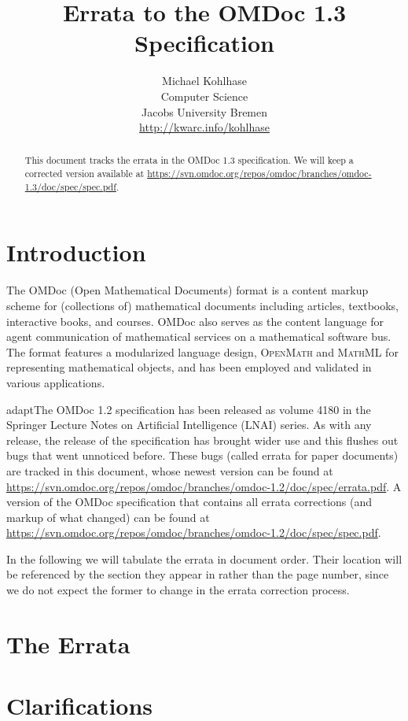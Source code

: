 \documentclass{article}
\title{Errata to the OMDoc 1.3 Specification}
\author{Michael Kohlhase\\
  Computer Science\\
  Jacobs University Bremen\\
  \url{http://kwarc.info/kohlhase}}
\def\omdoc{OMDoc}
\def\mathml{\scshape{MathML}}
\def\openmath{\scshape{OpenMath}}
\begin{document}
\maketitle
\begin{abstract}
  This document tracks the errata in the OMDoc 1.3 specification. We
  will keep a corrected version available at
  \url{https://svn.omdoc.org/repos/omdoc/branches/omdoc-1.3/doc/spec/spec.pdf}.
\end{abstract}

\section{Introduction}
The {\omdoc} (Open Mathematical Documents) format is a content markup scheme for
(collections of) mathematical documents including articles, textbooks, interactive books,
and courses.  {\omdoc} also serves as the content language for agent communication of
mathematical services on a mathematical software bus.  The format features a modularized
language design, {\openmath} and {\mathml} for representing mathematical objects, and has
been employed and validated in various applications.

\begin{oldpart}{adapt}The {\omdoc} 1.2 specification has been released as volume 4180 in the Springer Lecture
Notes on Artificial Intelligence (LNAI) series. As with any release, the release of the
specification has brought wider use and this flushes out bugs that went unnoticed before.
These bugs (called errata for paper documents) are tracked in this document, whose newest
version can be found at
\url{https://svn.omdoc.org/repos/omdoc/branches/omdoc-1.2/doc/spec/errata.pdf}. A
version of the OMDoc specification that contains all errata corrections (and markup of
what changed) can be found at
\url{https://svn.omdoc.org/repos/omdoc/branches/omdoc-1.2/doc/spec/spec.pdf}.

In the following we will tabulate the errata in document order. Their location will be
referenced by the section they appear in rather than the page number, since we do not
expect the former to change in the errata correction process.
\end{oldpart}
\newpage
\section{The Errata}

\newpage
\section{Clarifications}
\end{document}
